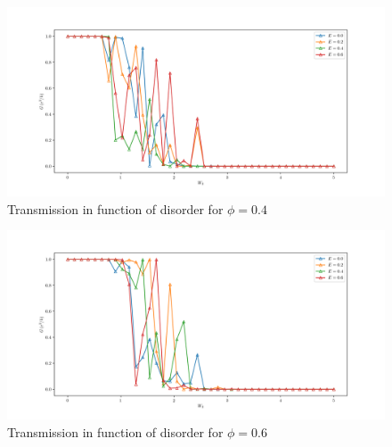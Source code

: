 \documentclass[12pt]{article}
\numberwithin{equation}{section}
\begin{document}
\newpage
\begin{figure}[h!]
  \begin{center}
  \includegraphics[height=0.85\textheight]{./media/transmission_graphene_lat_phi=0dot4Wmax=5.png}
  \caption{Transmission in function of disorder for $\phi=0.4$}
  \end{center}
\end{figure}
\begin{figure}[h!]
  \begin{center}
  \includegraphics[height=0.85\textheight]{./media/transmission_graphene_lat_phi=0dot6Wmax=5.png}
  \caption{Transmission in function of disorder for $\phi=0.6$}
  \end{center}
\end{figure}

\newpage
\end{document}
